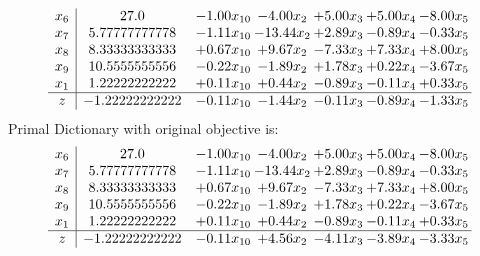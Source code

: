 \documentclass[9pt]{article}
\begin{document}
\[\begin{array}{c| c c@{\hskip 2pt} c@{\hskip 2pt} c@{\hskip 2pt} c@{\hskip 2pt} c@{\hskip 2pt} }
 x_{6}   &  27.0 & -1.00 x_{10} & -4.00 x_{2} & +  5.00 x_{3} & +  5.00 x_{4} & -8.00 x_{5}\\
 x_{7}   &  5.77777777778 & -1.11 x_{10} & -13.44 x_{2} & +  2.89 x_{3} & -0.89 x_{4} & -0.33 x_{5}\\
 x_{8}   &  8.33333333333 & +  0.67 x_{10} & +  9.67 x_{2} & -7.33 x_{3} & +  7.33 x_{4} & +  8.00 x_{5}\\
 x_{9}   &  10.5555555556 & -0.22 x_{10} & -1.89 x_{2} & +  1.78 x_{3} & +  0.22 x_{4} & -3.67 x_{5}\\
 x_{1}   &  1.22222222222 & +  0.11 x_{10} & +  0.44 x_{2} & -0.89 x_{3} & -0.11 x_{4} & +  0.33 x_{5}\\
\hline
z    &  -1.22222222222 & -0.11 x_{10} & -1.44 x_{2} & -0.11 x_{3} & -0.89 x_{4} & -1.33 x_{5}\\
\end{array}\]
Primal Dictionary with original objective is:
\[\begin{array}{c| c c@{\hskip 2pt} c@{\hskip 2pt} c@{\hskip 2pt} c@{\hskip 2pt} c@{\hskip 2pt} }
 x_{6}   &  27.0 & -1.00 x_{10} & -4.00 x_{2} & +  5.00 x_{3} & +  5.00 x_{4} & -8.00 x_{5}\\
 x_{7}   &  5.77777777778 & -1.11 x_{10} & -13.44 x_{2} & +  2.89 x_{3} & -0.89 x_{4} & -0.33 x_{5}\\
 x_{8}   &  8.33333333333 & +  0.67 x_{10} & +  9.67 x_{2} & -7.33 x_{3} & +  7.33 x_{4} & +  8.00 x_{5}\\
 x_{9}   &  10.5555555556 & -0.22 x_{10} & -1.89 x_{2} & +  1.78 x_{3} & +  0.22 x_{4} & -3.67 x_{5}\\
 x_{1}   &  1.22222222222 & +  0.11 x_{10} & +  0.44 x_{2} & -0.89 x_{3} & -0.11 x_{4} & +  0.33 x_{5}\\
\hline
z    &  -1.22222222222 & -0.11 x_{10} & +  4.56 x_{2} & -4.11 x_{3} & -3.89 x_{4} & -3.33 x_{5}\\
\end{array}\]
\end{document}
